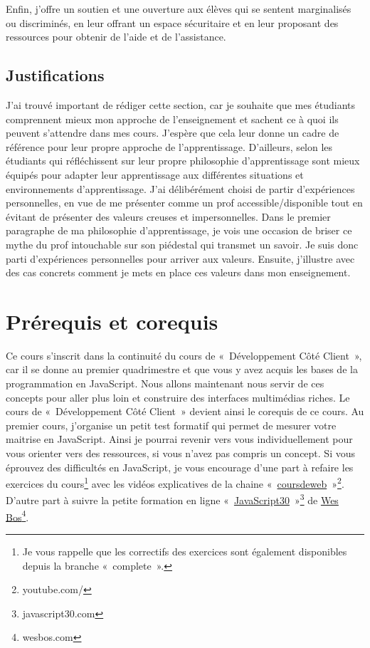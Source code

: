 Enfin, j'offre un soutien et une ouverture aux élèves qui se sentent marginalisés ou discriminés, en leur offrant un espace sécuritaire et en leur proposant des ressources pour obtenir de l'aide et de l'assistance.

\subsection{Justifications}

J’ai trouvé important de rédiger cette section, car je souhaite que mes étudiants comprennent mieux mon approche de l'enseignement et sachent ce à quoi ils peuvent s'attendre dans mes cours. J'espère que cela leur donne un cadre de référence pour leur propre approche de l'apprentissage. D’ailleurs, selon \citet{barkley2014collaborative} les étudiants qui réfléchissent sur leur propre philosophie d'apprentissage sont mieux équipés pour adapter leur apprentissage aux différentes situations et environnements d'apprentissage.
J'ai délibérément choisi de partir d'expériences personnelles, en vue de me présenter comme un prof accessible/disponible tout en évitant de présenter des valeurs creuses et impersonnelles. Dans le premier paragraphe de ma philosophie d'apprentissage, je vois une occasion de briser ce mythe du prof intouchable sur son piédestal qui transmet un savoir. Je suis donc parti d'expériences personnelles pour arriver aux valeurs. Ensuite, j'illustre avec des cas concrets comment je mets en place ces valeurs dans mon enseignement.

\clearpage
\section{Prérequis et corequis}

Ce cours s’inscrit dans la continuité du cours de «~Développement Côté Client~», car il se donne au premier quadrimestre et que vous y avez acquis les bases de la programmation en JavaScript. Nous allons maintenant nous servir de ces concepts pour aller plus loin et construire des interfaces multimédias riches. Le cours de «~Développement Côté Client~» devient ainsi le corequis de ce cours.
Au premier cours, j'organise un petit test formatif qui permet de mesurer votre maitrise en JavaScript. Ainsi je pourrai revenir vers vous individuellement pour vous orienter vers des ressources, si vous n’avez pas compris un concept. Si vous éprouvez des difficultés en JavaScript, je vous encourage d’une part à refaire les exercices du cours\footnote{Je vous rappelle que les correctifs des exercices sont également disponibles depuis la branche «~complete~».} avec les vidéos explicatives de la chaine «~\href{https://www.youtube.com/@coursdeweb}{coursdeweb}~»\footnote{youtube.com/\@coursdeweb}. D’autre part à suivre la petite formation en ligne «~\href{https://javascript30.com}{JavaScript30}~»\footnote{javascript30.com} de \href{https://wesbos.com}{Wes Bos}\footnote{wesbos.com}.

